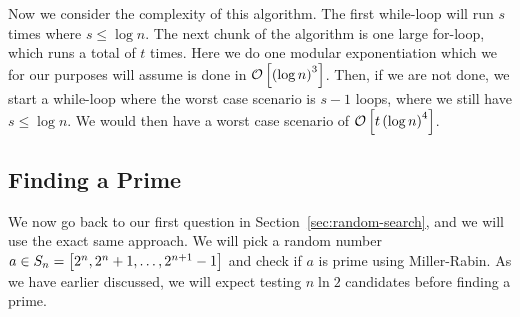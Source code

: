  Now we consider the complexity of this algorithm.
  The first while-loop will run $s$ times where $s \leq \log n$.
  The next chunk of the algorithm is one large for-loop, which runs a total of $t$ times.
  Here we do one modular exponentiation which we for our purposes will assume is done in $\mathcal{O} \left[  \left(  \log n  \right)^3 \right]$.
  Then, if we are not done, we start a while-loop where the worst case scenario is $s-1$ loops, where we still have $s \leq \log n$.
  We would then have a worst case scenario of $\mathcal{O} \left[  t \left(  \log n  \right)^4  \right]$.


\subsection{Finding a Prime}
  We now go back to our first question in Section~\ref{sec:random-search}, and we will use the exact same approach.
  We will pick a random number $a \in S_n = \left[  2^n, 2^n + 1, \dots, 2^{n+1}-1  \right]$ and check if $a$ is prime using Miller-Rabin.
  As we have earlier discussed, we will expect testing $n \ln 2$ candidates before finding a prime.
  
